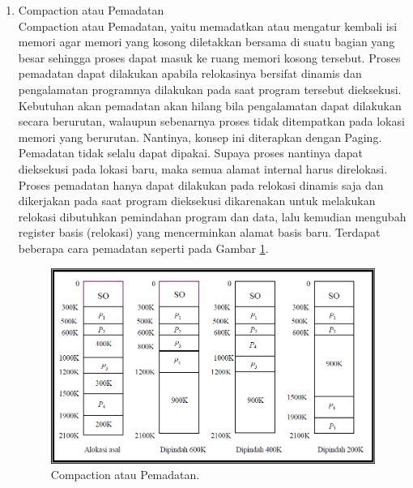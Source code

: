\begin{enumerate}

\item Compaction atau Pemadatan\\
Compaction atau Pemadatan, yaitu memadatkan atau mengatur kembali isi memori agar memori yang kosong diletakkan bersama di suatu bagian yang besar sehingga proses dapat masuk ke ruang memori kosong tersebut. Proses pemadatan dapat dilakukan apabila relokasinya bersifat dinamis dan pengalamatan programnya dilakukan pada saat program tersebut dieksekusi. Kebutuhan akan pemadatan akan hilang bila pengalamatan dapat dilakukan secara berurutan, walaupun sebenarnya proses tidak ditempatkan pada lokasi memori yang berurutan. Nantinya, konsep ini diterapkan dengan Paging. Pemadatan tidak selalu dapat dipakai. Supaya proses nantinya dapat dieksekusi pada lokasi baru, maka semua alamat internal harus direlokasi. Proses pemadatan hanya dapat dilakukan pada relokasi dinamis saja dan dikerjakan pada saat program dieksekusi dikarenakan untuk melakukan relokasi dibutuhkan pemindahan program dan data, lalu kemudian mengubah register basis (relokasi) yang mencerminkan alamat basis baru. Terdapat beberapa cara pemadatan seperti pada Gambar \ref{pemadatan}.

\begin{figure}[ht]
\centerline{\includegraphics[width=1\textwidth]{figures/pemadatan.png}}
\caption{Compaction atau Pemadatan.}
\label{pemadatan}
\end{figure}



\end{enumerate}
